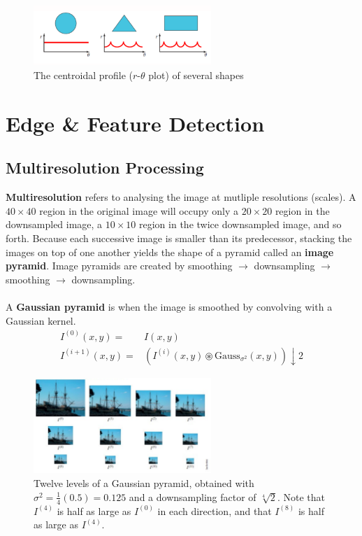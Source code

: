 \documentclass[a4paper,11pt]{article}
\begin{document}
\begin{figure}[H]
    \centering
    \includegraphics[width=0.6\textwidth]{images/centroidalprofile.png}
    \caption{The centroidal profile ($r$-$\theta$ plot) of several shapes}
\end{figure}

\section{Edge \& Feature Detection}
\subsection{Multiresolution Processing}
\textbf{Multiresolution} refers to analysing the image at mutliple resolutions (scales).
A $40 \times 40$ region in the original image will occupy only a $20 \times 20$ region in the downsampled image, a $10\times10$ region in the twice downsampled image, and so forth.
Because each successive image is smaller than its predecessor, stacking the images on top of one another yields the shape of a pyramid called an \textbf{image pyramid}.
Image pyramids are created by smoothing $\rightarrow$ downsampling $\rightarrow$ smoothing $\rightarrow$ downsampling.
\\\\
A \textbf{Gaussian pyramid} is when the image is smoothed by convolving with a Gaussian kernel.
\begin{align*}
    I^{(0)} (x,y)  =& I(x,y) \\
    I^{(i+1)}(x,y) =& \left( I^{(i)} (x,y) \circledast \text{Gauss}_{\sigma^2} (x,y) \right) \downarrow 2
\end{align*}

\begin{figure}[H]
    \centering
    \includegraphics[width=0.6\textwidth]{images/gaussianpyramids.png}
    \caption{
        Twelve levels of a Gaussian pyramid, obtained with $\sigma^2 = \frac{1}{4}(0.5) = 0.125$ and a downsampling factor of $\sqrt[4]{2}$.
        Note that $I^{(4)}$ is half as large as $I^{(0)}$ in each direction, and that $I^{(8)}$ is half as large as $I^{(4)}$.
    }
\end{figure}
\end{document}
